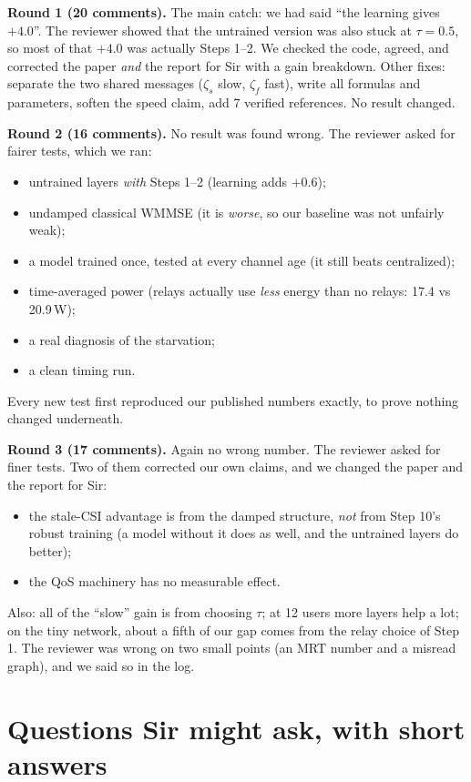 \documentclass[11pt,a4paper]{article}
\begin{document}
\textbf{Round 1 (20 comments).} The main catch: we had said ``the learning gives $+4.0$''. The reviewer showed
that the untrained version was also stuck at $\tau=0.5$, so most of that $+4.0$ was actually Steps 1--2. We
checked the code, agreed, and corrected the paper \emph{and} the report for Sir with a gain breakdown. Other fixes:
separate the two shared messages ($\zeta_s$ slow, $\zeta_f$ fast), write all formulas and parameters, soften the
speed claim, add 7 verified references. No result changed.

\textbf{Round 2 (16 comments).} No result was found wrong. The reviewer asked for fairer tests, which we ran:
\begin{itemize}
\item untrained layers \emph{with} Steps 1--2 (learning adds $+0.6$);
\item undamped classical WMMSE (it is \emph{worse}, so our baseline was not unfairly weak);
\item a model trained once, tested at every channel age (it still beats centralized);
\item time-averaged power (relays actually use \emph{less} energy than no relays: 17.4 vs 20.9\,W);
\item a real diagnosis of the starvation;
\item a clean timing run.
\end{itemize}
Every new test first reproduced our published numbers exactly, to prove nothing changed underneath.

\textbf{Round 3 (17 comments).} Again no wrong number. The reviewer asked for finer tests. Two of them
corrected our own claims, and we changed the paper and the report for Sir:
\begin{itemize}
\item the stale-CSI advantage is from the damped structure, \emph{not} from Step 10's robust training (a model
  without it does as well, and the untrained layers do better);
\item the QoS machinery has no measurable effect.
\end{itemize}
Also: all of the ``slow'' gain is from choosing $\tau$; at 12 users more layers help a lot; on the tiny network,
about a fifth of our gap comes from the relay choice of Step 1. The reviewer was wrong on two small points (an MRT
number and a misread graph), and we said so in the log.

\section{Questions Sir might ask, with short answers}
\end{document}
